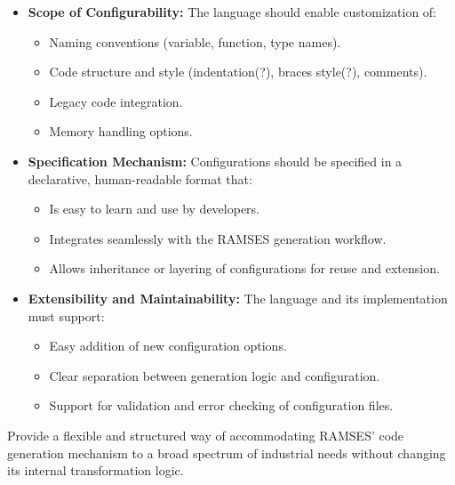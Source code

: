 \begin{itemize}
	\item \textbf{Scope of Configurability:} The language should enable customization of:
	\begin{itemize}
		\item Naming conventions (variable, function, type names).
		\item Code structure and style (indentation(?), braces style(?), comments).
		\item Legacy code integration.
		\item Memory handling options.
	\end{itemize}
	
	\item \textbf{Specification Mechanism:} Configurations should be specified in a declarative, human-readable format that:
	\begin{itemize}
		\item Is easy to learn and use by developers.
		\item Integrates seamlessly with the RAMSES generation workflow.
		\item Allows inheritance or layering of configurations for reuse and extension.
	\end{itemize}
	
	\item \textbf{Extensibility and Maintainability:} The language and its implementation must support:
	\begin{itemize}
		\item Easy addition of new configuration options.
		\item Clear separation between generation logic and configuration.
		\item Support for validation and error checking of configuration files.
	\end{itemize}
\end{itemize}

\begin{tcolorbox}[colback=green!10, colframe=green!50!black, title=Goal of the Configuration Language]
	Provide a flexible and structured way of accommodating RAMSES' code generation mechanism to a broad spectrum of industrial needs without changing its internal transformation logic.
\end{tcolorbox}



